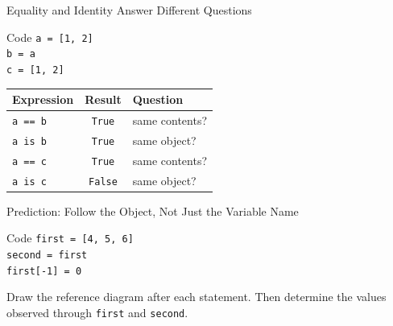 \documentclass[aspectratio=169,10pt]{beamer}
\begin{document}
\begin{frame}{Equality and Identity Answer Different Questions}
  \begin{block}{Code}
    \texttt{a = [1, 2]}\\
    \texttt{b = a}\\
    \texttt{c = [1, 2]}
  \end{block}

  \begin{center}
    \renewcommand{\arraystretch}{1.2}
    \begin{tabular}{l|c|l}
      \textbf{Expression} & \textbf{Result} & \textbf{Question} \\\hline
      \texttt{a == b} & \texttt{True} & same contents? \\
      \texttt{a is b} & \texttt{True} & same object? \\
      \texttt{a == c} & \texttt{True} & same contents? \\
      \texttt{a is c} & \texttt{False} & same object?
    \end{tabular}
  \end{center}
\end{frame}

\begin{frame}{Prediction: Follow the Object, Not Just the Variable Name}
  \begin{block}{Code}
    \texttt{first = [4, 5, 6]}\\
    \texttt{second = first}\\
    \texttt{first[-1] = 0}
  \end{block}

  \begin{activity}
    Draw the reference diagram after each statement. Then determine the values observed through \texttt{first} and \texttt{second}.
  \end{activity}
\end{frame}


\end{document}
